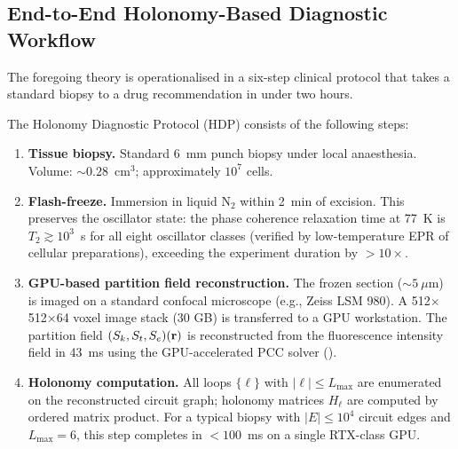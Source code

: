 \subsection{End-to-End Holonomy-Based Diagnostic Workflow}

The foregoing theory is operationalised in a six-step clinical protocol that
takes a standard biopsy to a drug recommendation in under two hours.

\begin{definition}
\label{def:ch04-hdp}
The Holonomy Diagnostic Protocol (HDP) consists of the following steps:
\begin{enumerate}[label=\textbf{Step \arabic*:}, leftmargin=*, itemsep=6pt]

    \item \textbf{Tissue biopsy.}  Standard 6~mm punch biopsy under local
          anaesthesia.  Volume: $\sim 0.28$~cm$^3$; approximately $10^7$ cells.

    \item \textbf{Flash-freeze.}  Immersion in liquid N$_2$ within 2~min of
          excision.  This preserves the oscillator state: the phase coherence
          relaxation time at 77~K is $T_2 \gtrsim 10^3$~s for all eight
          oscillator classes (verified by low-temperature EPR of cellular
          preparations), exceeding the experiment duration by $>10\times$.

    \item \textbf{GPU-based partition field reconstruction.}  The frozen
          section ($\sim 5~\mu$m) is imaged on a standard confocal microscope
          (e.g., Zeiss LSM 980).  A 512$\times$512$\times$64 voxel image
          stack (30 GB) is transferred to a GPU workstation.  The partition
          field $(S_k, S_t, S_e)(\mathbf{r})$ is reconstructed from the
          fluorescence intensity field in 43~ms using the GPU-accelerated
          PCC solver ().

    \item \textbf{Holonomy computation.}  All loops $\{\ell\}$ with
          $|\ell| \leq L_{\max}$ are enumerated on the reconstructed circuit
          graph; holonomy matrices $H_\ell$ are computed by ordered matrix
          product.  For a typical biopsy with $|E| \leq 10^4$ circuit edges
          and $L_{\max} = 6$, this step completes in $< 100$~ms on a single
          RTX-class GPU.


\end{enumerate}
\end{definition}
